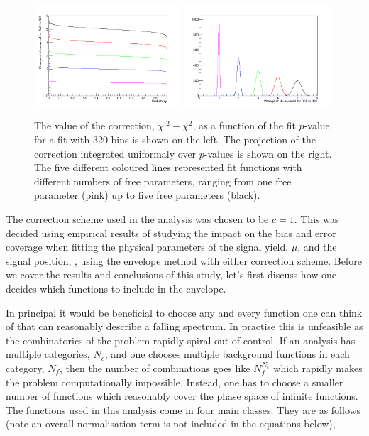 \begin{figure}
  \begin{center}
    \includegraphics[width=0.49\textwidth]{analysis/plots/ChisqConv1.png}
    \includegraphics[width=0.49\textwidth]{analysis/plots/ChisqConv2.png}
    \caption[An estimation of the correction required in the envelope method]{The value of the correction, $\chi^{\prime 2} - \chi^{2}$, as a function of the fit $p$-value for a fit with 320 bins is shown on the left. The projection of the correction integrated uniformaly over $p$-values is shown on the right. The five different coloured lines represented fit functions with different numbers of free parameters, ranging from one free parameter (pink) up to five free parameters (black).}
    \label{fig:envelope_chi2_correction}
  \end{center}
\end{figure}
The correction scheme used in the analysis was chosen to be $c=1$. This was decided using empirical results of studying the impact on the bias and error coverage when fitting the physical parameters of the signal yield, $\mu$, and the signal position, \mH, using the envelope method with either correction scheme. Before we cover the results and conclusions of this study, let's first discuss how one decides which functions to include in the envelope.

In principal it would be beneficial to choose any and every function one can think of that can reasonably describe a falling spectrum. In practise this is unfeasible as the combinatorics of the problem rapidly spiral out of control. If an analysis has multiple categories, $N_{c}$, and one chooses multiple background functions in each category, $N_{f}$, then the number of combinations goes like $N_{f}^{N_{c}}$ which rapidly makes the problem computationally impossible. Instead, one has to choose a smaller number of functions which reasonably cover the phase space of infinite functions. The functions used in this analysis come in four main classes. They are as follows (note an overall normalisation term is not included in the equations below),

